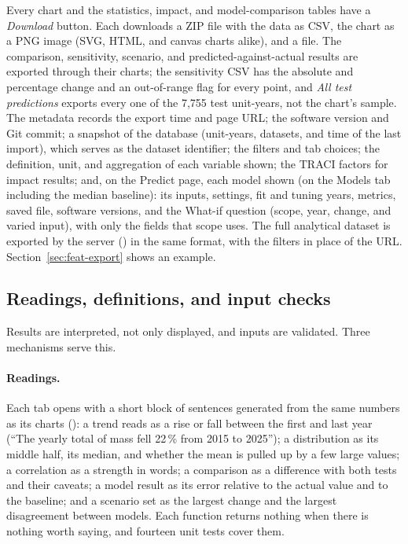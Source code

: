 \documentclass[11pt,a4paper]{article}
\begin{document}
Every chart and the statistics, impact, and model-comparison tables have a \emph{Download}
button. Each downloads a ZIP file with the data as CSV, the chart as a PNG image (SVG, HTML, and
canvas charts alike), and a  file. The comparison, sensitivity, scenario, and
predicted-against-actual results are exported through their charts; the sensitivity CSV has the
absolute and percentage change and an out-of-range flag for every point, and \emph{All test
predictions} exports every one of the
7{,}755 test unit-years, not the chart's sample. The metadata records the export time and page URL; the
software version and Git commit; a snapshot of the database (unit-years, datasets, and time of
the last import), which serves as the dataset identifier; the filters and tab choices; the
definition, unit, and aggregation of each variable shown; the TRACI factors for impact results;
and, on the Predict page, each model shown (on the Models tab including the median baseline): its
inputs, settings, fit and tuning years, metrics, saved file, software versions, and the What-if
question (scope, year, change, and varied input), with only the fields that scope uses. The full analytical dataset is exported by the
server () in the same format, with the filters in place of the
URL. Section~\ref{sec:feat-export} shows an example.

\subsection{Readings, definitions, and input checks}
\label{sec:readings}

Results are interpreted, not only displayed, and inputs are validated. Three mechanisms serve
this.

\paragraph{Readings.} Each tab opens with a short block of sentences generated from the same
numbers as its charts (): a trend reads as a rise or fall between the
first and last year (``The yearly total of \COtwo{} mass fell 22\,\% from 2015 to 2025''); a
distribution as its middle half, its median, and whether the mean is pulled up by a few large
values; a correlation as a strength in words; a comparison as a difference with both tests and
their caveats; a model result as its error relative to the actual value and to the baseline; and
a scenario set as the largest change and the largest disagreement between models. Each function
returns nothing when there is nothing worth saying, and fourteen unit tests cover them.
\end{document}
